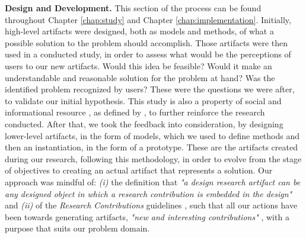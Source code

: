 \textbf{Design and Development.} This section of the process can be found throughout Chapter \ref{chap:study} and Chapter \ref{chap:implementation}. Initially, high-level artifacts were designed, both as models and methods, of what a possible solution to the problem should accomplish. Those artifacts were then used in a conducted study, in order to assess what would be the perceptions of users to our new artifacts. Would this idea be feasible? Would it make an understandable and reasonable solution for the problem at hand? Was the identified problem recognized by users? These were the questions we were after, to validate our initial hypothesis. This study is also a property of social and informational resource \cite[6]{peffers_design_2007}, as defined by \citeauthor{peffers_design_2007} \cite{peffers_design_2007}, to further reinforce the research conducted. After that, we took the feedback into consideration, by designing lower-level artifacts, in the form of models, which we used to define methods and then an instantiation, in the form of a prototype. These are the artifacts created during our research, following this methodology, in order to evolve from the stage of objectives to creating an actual artifact that represents a solution. Our approach was mindful of: \emph{(i)} the definition that \textit{"a design research artifact can be any designed object in which a research contribution is embedded in the design"} \cite[13]{peffers_design_2007} and \emph{(ii)} of the \textit{Research Contributions} guidelines \cite[87]{hevner_design_2004}, such that all our actions have been towards generating artifacts, \textit{"new and interesting contributions"} \cite[87]{hevner_design_2004}, with a purpose that suits our problem domain.

